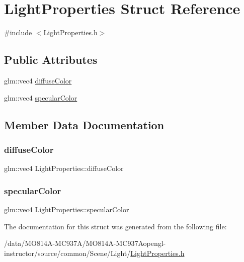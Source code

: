 \hypertarget{struct_light_properties}{}\section{Light\+Properties Struct Reference}
\label{struct_light_properties}


{\ttfamily \#include $<$Light\+Properties.\+h$>$}

\subsection*{Public Attributes}
\begin{DoxyCompactItemize}
\item
glm\+::vec4 \hyperlink{struct_light_properties_a3af836c1b945d14e8e11baccae2c8c9e}{diffuse\+Color}
\item
glm\+::vec4 \hyperlink{struct_light_properties_a802ad3c68cfec9c97b0de463ff6e74ac}{specular\+Color}
\end{DoxyCompactItemize}


\subsection{Member Data Documentation}
\hypertarget{struct_light_properties_a3af836c1b945d14e8e11baccae2c8c9e}{}\label{struct_light_properties_a3af836c1b945d14e8e11baccae2c8c9e}
\subsubsection{\texorpdfstring{diffuse\+Color}{diffuseColor}}
{\footnotesize\ttfamily glm\+::vec4 Light\+Properties\+::diffuse\+Color}

\hypertarget{struct_light_properties_a802ad3c68cfec9c97b0de463ff6e74ac}{}\label{struct_light_properties_a802ad3c68cfec9c97b0de463ff6e74ac}
\subsubsection{\texorpdfstring{specular\+Color}{specularColor}}
{\footnotesize\ttfamily glm\+::vec4 Light\+Properties\+::specular\+Color}



The documentation for this struct was generated from the following file\+:\begin{DoxyCompactItemize}
\item
/data/MO814A-MC937A/MO814A-MC937Aopengl-\/instructor/source/common/\+Scene/\+Light/\hyperlink{_light_properties_8h}{Light\+Properties.\+h}\end{DoxyCompactItemize}
